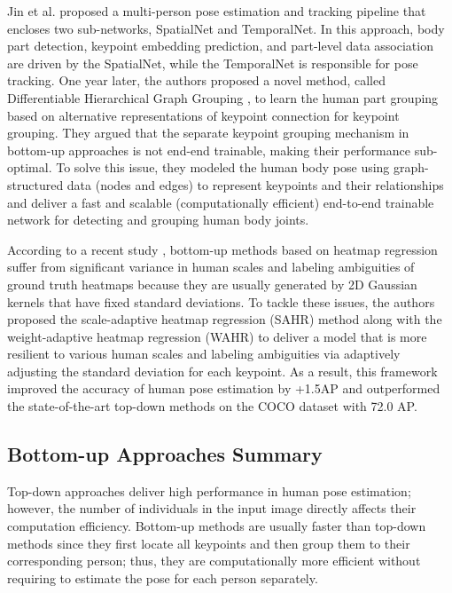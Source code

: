 Jin et al. \cite{jin_multi-person_2019} proposed a multi-person pose estimation and tracking pipeline that encloses two sub-networks, SpatialNet and TemporalNet. In this approach, body part detection, keypoint embedding prediction, and part-level data association are driven by the SpatialNet, while the TemporalNet is responsible for pose tracking. One year later, the authors proposed a novel method, called Differentiable Hierarchical Graph Grouping \cite{jin_differentiable_2020}, to learn the human part grouping based on alternative representations of keypoint connection for keypoint grouping. They argued that the separate keypoint grouping mechanism in bottom-up approaches is not end-end trainable, making their performance sub-optimal. To solve this issue, they modeled the human body pose using graph-structured data (nodes and edges) to represent keypoints and their relationships and deliver a fast and scalable (computationally efficient) end-to-end trainable network for detecting and grouping human body joints. 

According to a recent study \cite{luo_rethinking_2021}, bottom-up methods based on heatmap regression suffer from significant variance in human scales and labeling ambiguities of ground truth heatmaps because they are usually generated by 2D Gaussian kernels that have fixed standard deviations. To tackle these issues, the authors proposed the scale-adaptive heatmap regression (SAHR) method along with the weight-adaptive heatmap regression (WAHR) to deliver a model that is more resilient to various human scales and labeling ambiguities via adaptively adjusting the standard deviation for each keypoint. As a result, this framework improved the accuracy of human pose estimation by +1.5AP and outperformed the state-of-the-art top-down methods on the COCO dataset with 72.0 AP.


\subsection*{Bottom-up Approaches Summary}

Top-down approaches deliver high performance in human pose estimation; however, the number of individuals in the input image directly affects their computation efficiency. Bottom-up methods are usually faster than top-down methods since they first locate all keypoints and then group them to their corresponding person; thus, they are computationally more efficient without requiring to estimate the pose for each person separately. 

